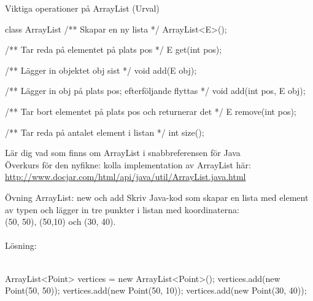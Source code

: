 \begin{Slide}{Viktiga operationer på ArrayList (Urval)}
\begin{JavaSpec}{class ArrayList}
/** Skapar en ny lista */
ArrayList<E>();

/** Tar reda på elementet på plats pos */
E get(int pos);

/** Lägger in objektet obj sist */
void add(E obj);

/** Lägger in obj på plats pos; efterföljande flyttas */
void add(int pos, E obj);

/** Tar bort elementet på plats pos och returnerar det */
E remove(int pos);

/** Tar reda på antalet element i listan */
int size();
\end{JavaSpec}
Lär dig vad som finns om ArrayList i snabbreferensen för Java\\
\SlideFontSmall Överkurs för den nyfikne: kolla implementation av ArrayList här: \\ {\SlideFontTiny\url{http://www.docjar.com/html/api/java/util/ArrayList.java.html}}
\end{Slide}


\begin{Slide}{Övning ArrayList: new och add}
Skriv Java-kod som skapar en lista med element av typen  och lägger in tre punkter i listan med koordinaterna:\\ (50, 50), (50,10) och (30, 40).
\pause
~\\~\\ Lösning: \ifkompendium\else\\~\\\fi
\begin{Code}[numberstyle=,language=Java]
ArrayList<Point> vertices = new ArrayList<Point>();
vertices.add(new Point(50, 50));
vertices.add(new Point(50, 10));
vertices.add(new Point(30, 40));
\end{Code}
\end{Slide}


